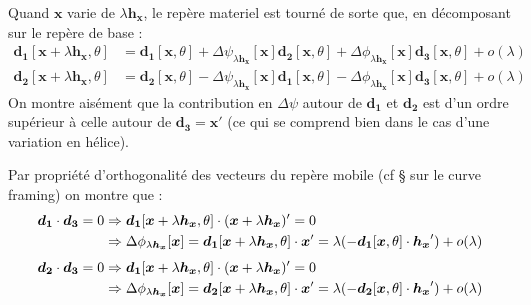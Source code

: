 Quand $\boldsymbol{x}$ varie de $\lambda\boldsymbol{h_x}$, le repère materiel est tourné de sorte que, en décomposant sur le repère de base :
\begin{align}
	\boldsymbol{d_1}[\boldsymbol{x}+\lambda\boldsymbol{h_x}, \theta] & = \boldsymbol{d_1}[\boldsymbol{x}, \theta] + \Delta\psi_{\lambda\boldsymbol{h_x}}[\boldsymbol{x}]\boldsymbol{d_2}[\boldsymbol{x}, \theta] + \Delta\phi_{\lambda\boldsymbol{h_x}}[\boldsymbol{x}]\boldsymbol{d_3}[\boldsymbol{x}, \theta] + o(\lambda)\\
	\boldsymbol{d_2}[\boldsymbol{x}+\lambda\boldsymbol{h_x}, \theta] & = \boldsymbol{d_2}[\boldsymbol{x}, \theta] - \Delta\psi_{\lambda\boldsymbol{h_x}}[\boldsymbol{x}]\boldsymbol{d_1}[\boldsymbol{x}, \theta] - \Delta\phi_{\lambda\boldsymbol{h_x}}[\boldsymbol{x}]\boldsymbol{d_3}[\boldsymbol{x}, \theta] + o(\lambda)
\end{align}
On montre aisément que la contribution en $\Delta\psi$ autour de $\boldsymbol{d_1}$ et $\boldsymbol{d_2}$ est d'un ordre supérieur à celle autour de $\boldsymbol{d_3} = \boldsymbol{x}'$ (ce qui se comprend bien dans le cas d'une variation en hélice).

Par propriété d'orthogonalité des vecteurs du repère mobile (cf § sur le curve framing) on montre que :
\begin{align}
	\boldsymbol{d_1}\cdot\boldsymbol{d_3} = 0 &\Rightarrow \boldsymbol{d_1}[\boldsymbol{x}+\lambda\boldsymbol{h_x}, \theta] \cdot (\boldsymbol{x}+\lambda\boldsymbol{h_x})' = 0\\
	&\Rightarrow \Delta\phi_{\lambda\boldsymbol{h_x}}[\boldsymbol{x}] = \boldsymbol{d_1}[\boldsymbol{x}+\lambda\boldsymbol{h_x}, \theta] \cdot \boldsymbol{x}' = \lambda(-\boldsymbol{d_1}[\boldsymbol{x}, \theta] \cdot \boldsymbol{h_x}') + o(\lambda) \notag
\end{align}
\begin{align}
	\boldsymbol{d_2}\cdot\boldsymbol{d_3} = 0 &\Rightarrow \boldsymbol{d_1}[\boldsymbol{x}+\lambda\boldsymbol{h_x}, \theta] \cdot (\boldsymbol{x}+\lambda\boldsymbol{h_x})' = 0\\
	&\Rightarrow \Delta\phi_{\lambda\boldsymbol{h_x}}[\boldsymbol{x}] = \boldsymbol{d_2}[\boldsymbol{x}+\lambda\boldsymbol{h_x}, \theta] \cdot \boldsymbol{x}' = \lambda(-\boldsymbol{d_2}[\boldsymbol{x}, \theta] \cdot \boldsymbol{h_x}') + o(\lambda) \notag
\end{align}

